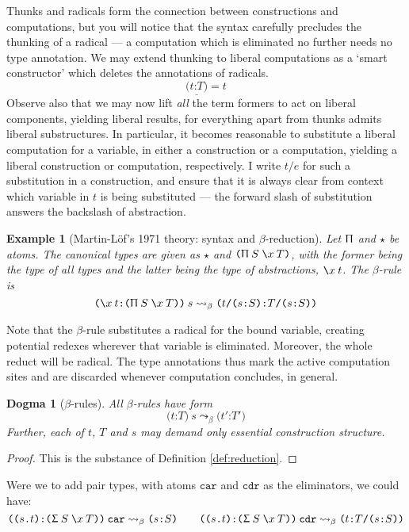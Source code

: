 \documentclass{jfp1}
\newtheorem{dogma}[theorem]{Dogma}
\newtheorem{example}[theorem]{Example}
\newcommand{\fsl}{\texttt{/}}
\newcommand{\Pa}[1]{\texttt{(}#1\texttt{)}}
\newcommand{\dt}{\texttt{.}}
\newcommand{\cn}[2]{\Pa{#1 \dt #2}}
\newcommand{\hb}{\texttt{:}}
\newcommand{\ra}[2]{\Pa{#1 \hb #2}}
\newcommand{\Ne}{\underline}
\begin{document}
Thunks and radicals form the connection between constructions and
computations, but you will notice that the syntax carefully precludes
the thunking of a radical --- a computation which is eliminated no
further needs no type annotation. We may extend thunking to liberal
computations as a `smart constructor' which deletes the annotations
of radicals.
\[
  \Ne{\ra tT} = t
\]
Observe also that we may now lift
\emph{all} the term formers to act on liberal components, yielding
liberal results, for everything apart from thunks admits
liberal substructures. In particular, it becomes reasonable to
substitute a liberal computation for a variable, in either a
construction or a computation, yielding a liberal construction or
computation, respectively. I write $t\fsl e$ for such a substitution
in a construction, and ensure that it is always clear from context
which variable in $t$ is being substituted --- the forward slash
of substitution answers the backslash of abstraction.

\newcommand{\U}{\ensuremath{\star}}

\begin{example}[Martin-L\"of's 1971 theory: syntax and $\beta$-reduction]
  Let $\Uppi$ and $\U$ be atoms. The canonical types are given as
  $\U$ and $\PI SxT$, with the former being the type of all types
  and the latter being the type of abstractions, $\la xt$. The
  $\beta$-rule is
\[
  \ra{\la xt}{\PI SxT}\:s \leadsto_\beta \ra{t\fsl\ra sS}{T\fsl\ra sS}
\]
\end{example}

Note that the $\beta$-rule substitutes a radical
for the bound variable, creating potential redexes wherever that
variable is eliminated. Moreover, the whole reduct will be radical. The type
annotations thus mark the active computation sites and are discarded
whenever computation concludes, in general.

\begin{dogma}[$\beta$-rules]
  All $\beta$-rules have form
  \[\ra tT\:s \leadsto_\beta \ra{t'}{T'}
  \]
  Further, each of $t$, $T$ and $s$ may demand only essential
  construction structure.
\end{dogma}
\begin{proof}
  This is the substance of Definition \ref{def:reduction}.
\end{proof}

\newcommand{\car}{\texttt{car}} 
\newcommand{\cdr}{\texttt{cdr}} 
Were we to add pair types, with atoms $\car$ and $\cdr$ as the
eliminators, we could have:
\[\ra{\cn st}{\SG SxT}\:\car \leadsto_\beta \ra sS \qquad
  \ra{\cn st}{\SG SxT}\:\cdr \leadsto_\beta \ra t{T\fsl\ra sS}
\]
\end{document}
